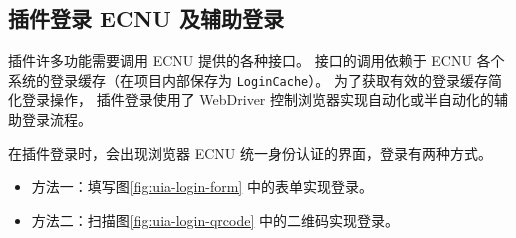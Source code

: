 \subsection{插件登录 ECNU 及辅助登录}\label{subsec:plugin-login-ecnu}

插件许多功能需要调用 ECNU 提供的各种接口。
接口的调用依赖于 ECNU 各个系统的登录缓存（在项目内部保存为 \verb`LoginCache`）。
为了获取有效的登录缓存简化登录操作，
插件登录使用了 WebDriver 控制浏览器实现自动化或半自动化的辅助登录流程。

在插件登录时，会出现浏览器 ECNU 统一身份认证的界面，登录有两种方式。
\begin{itemize}
    \item 方法一：填写图\ref{fig:uia-login-form} 中的表单实现登录。
    \item 方法二：扫描图\ref{fig:uia-login-qrcode} 中的二维码实现登录。
\end{itemize}

